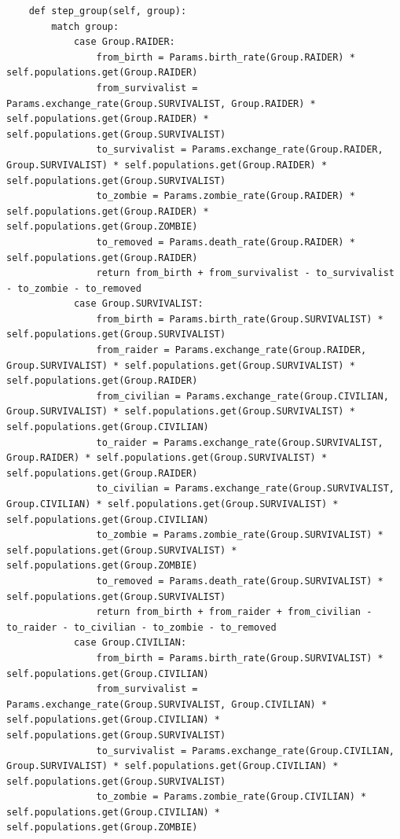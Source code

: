 \documentclass{article}
\begin{document}
\begin{lstlisting}
    def step_group(self, group):
        match group:
            case Group.RAIDER:
                from_birth = Params.birth_rate(Group.RAIDER) * self.populations.get(Group.RAIDER)
                from_survivalist = Params.exchange_rate(Group.SURVIVALIST, Group.RAIDER) * self.populations.get(Group.RAIDER) * self.populations.get(Group.SURVIVALIST)
                to_survivalist = Params.exchange_rate(Group.RAIDER, Group.SURVIVALIST) * self.populations.get(Group.RAIDER) * self.populations.get(Group.SURVIVALIST)
                to_zombie = Params.zombie_rate(Group.RAIDER) * self.populations.get(Group.RAIDER) * self.populations.get(Group.ZOMBIE)
                to_removed = Params.death_rate(Group.RAIDER) * self.populations.get(Group.RAIDER)
                return from_birth + from_survivalist - to_survivalist - to_zombie - to_removed
            case Group.SURVIVALIST:
                from_birth = Params.birth_rate(Group.SURVIVALIST) * self.populations.get(Group.SURVIVALIST)
                from_raider = Params.exchange_rate(Group.RAIDER, Group.SURVIVALIST) * self.populations.get(Group.SURVIVALIST) * self.populations.get(Group.RAIDER)
                from_civilian = Params.exchange_rate(Group.CIVILIAN, Group.SURVIVALIST) * self.populations.get(Group.SURVIVALIST) * self.populations.get(Group.CIVILIAN)
                to_raider = Params.exchange_rate(Group.SURVIVALIST, Group.RAIDER) * self.populations.get(Group.SURVIVALIST) * self.populations.get(Group.RAIDER)
                to_civilian = Params.exchange_rate(Group.SURVIVALIST, Group.CIVILIAN) * self.populations.get(Group.SURVIVALIST) * self.populations.get(Group.CIVILIAN)
                to_zombie = Params.zombie_rate(Group.SURVIVALIST) * self.populations.get(Group.SURVIVALIST) * self.populations.get(Group.ZOMBIE)
                to_removed = Params.death_rate(Group.SURVIVALIST) * self.populations.get(Group.SURVIVALIST)
                return from_birth + from_raider + from_civilian - to_raider - to_civilian - to_zombie - to_removed
            case Group.CIVILIAN:
                from_birth = Params.birth_rate(Group.SURVIVALIST) * self.populations.get(Group.CIVILIAN)
                from_survivalist = Params.exchange_rate(Group.SURVIVALIST, Group.CIVILIAN) * self.populations.get(Group.CIVILIAN) * self.populations.get(Group.SURVIVALIST)
                to_survivalist = Params.exchange_rate(Group.CIVILIAN, Group.SURVIVALIST) * self.populations.get(Group.CIVILIAN) * self.populations.get(Group.SURVIVALIST)
                to_zombie = Params.zombie_rate(Group.CIVILIAN) * self.populations.get(Group.CIVILIAN) * self.populations.get(Group.ZOMBIE)

\end{lstlisting}
\end{document}
